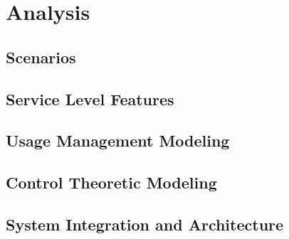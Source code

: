 \section{Analysis}

\subsection{Scenarios}

\subsection{Service Level Features}

\subsection{Usage Management Modeling}

\subsection{Control Theoretic Modeling}

\subsection{System Integration and Architecture}
